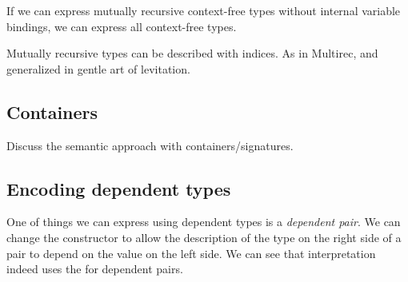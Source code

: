 If we can express mutually recursive context-free types without internal
variable bindings, we can express all context-free types.

Mutually recursive types can be described with indices. As in
Multirec, and generalized in gentle art of levitation.

\subsection{Containers}

Discuss the semantic approach with containers/signatures.


\subsection{Encoding dependent types}

One of things we can express using dependent types is a
\emph{dependent pair}.
We can change the constructor  to allow the description of
the type on the right side of a pair to depend on the value on the
left side.
We can see that interpretation indeed uses the  for dependent pairs.


